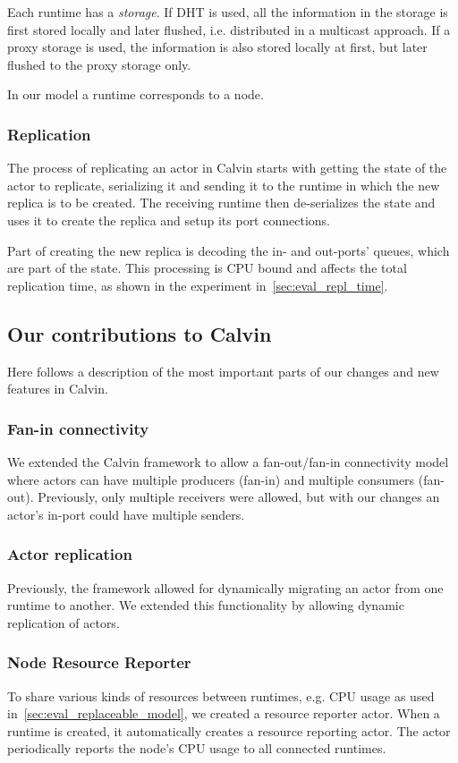 \documentclass{cslthse-msc}
\begin{document}
Each runtime has a \emph{storage}. If DHT is used, all the information in the storage is first stored locally and later flushed, i.e. distributed in a multicast approach. If a proxy storage is used, the information is also stored locally at first, but later flushed to the proxy storage only.

In our model a runtime corresponds to a node.

\subsubsection{Replication} \label{subsec:calvin_replication}
The process of replicating an actor in Calvin starts with getting the state of the actor to replicate, serializing it and sending it to the runtime in which the new replica is to be created. The receiving runtime then de-serializes the state and uses it to create the replica and setup its port connections.

Part of creating the new replica is decoding the in- and out-ports' queues, which are part of the state. This processing is CPU bound and affects the total replication time, as shown in the experiment in~\cref{sec:eval_repl_time}.

\subsection{Our contributions to Calvin} \label{subsec:design_contributions} %
Here follows a description of the most important parts of our changes and new features in Calvin.

\subsubsection{Fan-in connectivity}
We extended the Calvin framework to allow a fan-out/fan-in connectivity model where actors can have multiple producers (fan-in) and multiple consumers (fan-out). Previously, only multiple receivers were allowed, but with our changes an actor's in-port could have multiple senders.

\subsubsection{Actor replication}
Previously, the framework allowed for dynamically migrating an actor from one runtime to another. We extended this functionality by allowing dynamic replication of actors. 

\subsubsection{Node Resource Reporter}
To share various kinds of resources between runtimes, e.g. CPU usage as used in~\cref{sec:eval_replaceable_model}, we created a resource reporter actor. When a runtime is created, it automatically creates a resource reporting actor. The actor periodically reports the node's CPU usage to all connected runtimes. 
\end{document}
